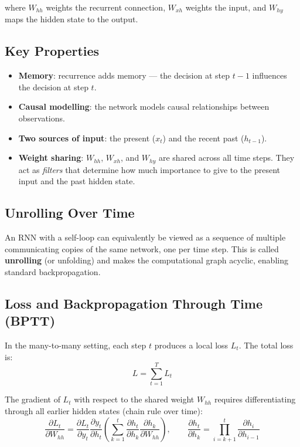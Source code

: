 \documentclass[11pt,a4paper]{article}
\theoremstyle{definition}
\theoremstyle{plain}
\theoremstyle{remark}
\begin{document}
where $W_{hh}$ weights the recurrent connection, $W_{xh}$ weights the input, and $W_{hy}$ maps the hidden state to the output.

\subsection{Key Properties}

\begin{itemize}
    \item \textbf{Memory}: recurrence adds memory --- the decision at step $t-1$ influences the decision at step $t$.
    \item \textbf{Causal modelling}: the network models causal relationships between observations.
    \item \textbf{Two sources of input}: the present ($x_t$) and the recent past ($h_{t-1}$).
    \item \textbf{Weight sharing}: $W_{hh}$, $W_{xh}$, and $W_{hy}$ are shared across all time steps. They act as \emph{filters} that determine how much importance to give to the present input and the past hidden state.
\end{itemize}

\subsection{Unrolling Over Time}

An RNN with a self-loop can equivalently be viewed as a sequence of multiple communicating copies of the same network, one per time step. This is called \textbf{unrolling} (or unfolding) and makes the computational graph acyclic, enabling standard backpropagation.

\subsection{Loss and Backpropagation Through Time (BPTT)}

In the many-to-many setting, each step $t$ produces a local loss $L_t$. The total loss is:
\[
    L = \sum_{t=1}^{T} L_t
\]

The gradient of $L_t$ with respect to the shared weight $W_{hh}$ requires differentiating through all earlier hidden states (chain rule over time):
\[
    \frac{\partial L_t}{\partial W_{hh}} = \frac{\partial L_t}{\partial y_t}\frac{\partial y_t}{\partial h_t}
    \left(\sum_{k=1}^{t} \frac{\partial h_t}{\partial h_k}\frac{\partial h_k}{\partial W_{hh}}\right),
    \qquad \frac{\partial h_t}{\partial h_k} = \prod_{i=k+1}^{t} \frac{\partial h_i}{\partial h_{i-1}}
\]
\end{document}
